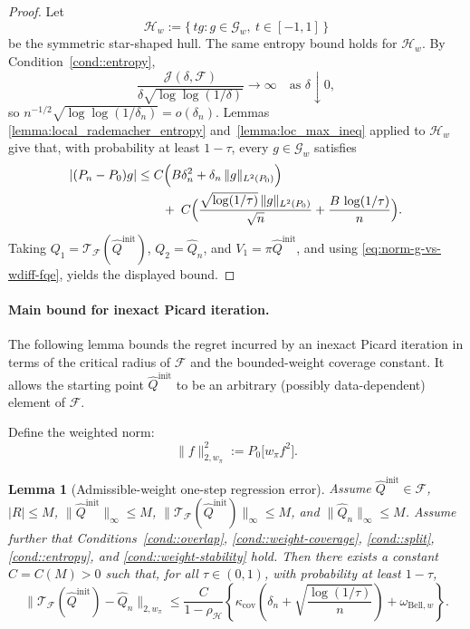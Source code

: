 \documentclass{article}
\theoremstyle{plain}
\newtheorem{lemma}{Lemma}
\theoremstyle{definition}
\theoremstyle{remark}
\begin{document}
\begin{proof}
Let
\[
\mathcal H_w
:=
\{\,t g: g\in\mathcal G_w,\ t\in[-1,1]\,\}
\]
be the symmetric star-shaped hull. The same entropy bound holds for
$\mathcal H_w$. By Condition~\ref{cond::entropy},
\[
\frac{\mathcal J(\delta,\mathcal F)}
{\delta\sqrt{\log\log(1/\delta)}}\to\infty
\quad\text{as }\delta\downarrow0,
\]
so $n^{-1/2}\sqrt{\log\log(1/\delta_n)}=o(\delta_n)$. Lemmas~
\ref{lemma:local_rademacher_entropy} and~\ref{lemma:loc_max_ineq} applied to
$\mathcal H_w$ give that, with probability at least $1-\tau$, every
$g\in\mathcal G_w$ satisfies
\begin{align*}
|(P_n-P_0)g|
&\le
C\Bigl(
    B\delta_n^2
    + \delta_n\,\|g\|_{L^2(P_0)}
\Bigr)
\\
&\qquad+\;
C\Bigl(
    \frac{\sqrt{\log(1/\tau)}\,\|g\|_{L^2(P_0)}}{\sqrt{n}}
    + \frac{B\,\log(1/\tau)}{n}
\Bigr).
\end{align*}
Taking $Q_1=\mathcal T_{\mathcal F}(\hat Q^{\mathrm{init}})$,
$Q_2=\hat Q_n$, and $V_1=\pi\hat Q^{\mathrm{init}}$, and using
\eqref{eq:norm-g-vs-wdiff-fqe}, yields the displayed bound.
\end{proof}

\paragraph{Main bound for inexact Picard
iteration.} The following lemma bounds the regret incurred by an inexact Picard
iteration in terms of the critical radius of $\mathcal{F}$ and the
bounded-weight coverage constant. It allows the
starting point $\hat{Q}^{\mathrm{init}}$ to be an arbitrary (possibly
data-dependent) element of $\mathcal{F}$.

Define the weighted norm:
\[
\|f\|_{2,w_{\pi}}^2 := P_0\big[w_{\pi} f^2\big].
\]

\begin{lemma}[Admissible-weight one-step regression error]
\label{lemma::errorperiter2}
Assume \(\hat Q^{\mathrm{init}}\in\mathcal F\), \(|R|\le M\),
\(\|\hat Q^{\mathrm{init}}\|_\infty\le M\),
\(\|\mathcal T_{\mathcal F}(\hat Q^{\mathrm{init}})\|_\infty\le M\), and
\(\|\hat Q_n\|_\infty\le M\). Assume further that
Conditions~\ref{cond::overlap}, \ref{cond::weight-coverage},
\ref{cond::split}, \ref{cond::entropy}, and \ref{cond::weight-stability} hold.
Then there exists a constant
\(C=C(M)>0\) such that, for all \(\tau \in (0,1)\), with probability at
least \(1-\tau\),
\[
\|\mathcal{T}_{\mathcal{F}}(\hat{Q}^{\mathrm{init}})-\hat{Q}_n\|_{2,w_{\pi}}
\le
\frac{C}{1-\rho_{\mathcal H}}
\left\{
\kappa_{\mathrm{cov}}
\left(
\delta_n+\sqrt{\frac{\log(1/\tau)}{n}}
\right)
+
\omega_{\mathrm{Bell},w}
\right\}.
\]
\end{lemma}
\end{document}
